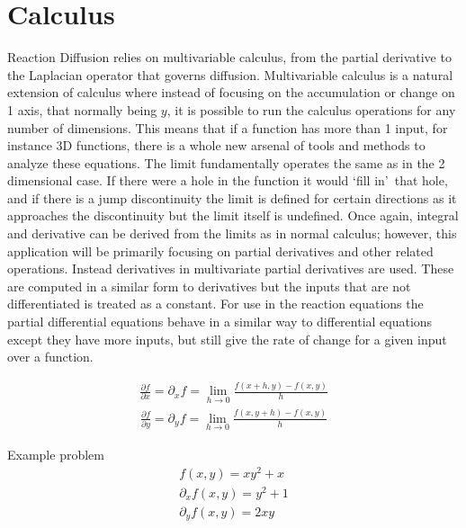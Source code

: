 \documentclass[12pt, letterpaper]{article}
\newcommand{\sorta}[1]{\lq #1\rq \,}
\begin{document}
\section{Calculus} \label{calculus}
Reaction Diffusion relies on multivariable calculus, from the partial derivative to the Laplacian 
operator that governs diffusion. Multivariable calculus is a natural extension of calculus where instead of 
focusing on the accumulation or change on 1 axis, that normally being $y$, it is possible to run the calculus
operations for any
number of dimensions. This means that if a function has more than 1 input, for instance 3D functions,
there is a whole new arsenal of tools and methods to analyze these equations. The limit
fundamentally operates the same as in the 2 dimensional case. If there were a hole in the function it
would \sorta{fill in} that hole, and if there is a jump discontinuity the limit is
defined for certain directions as it approaches the discontinuity but the limit itself is undefined. Once
again, integral and derivative can be derived from the limits as in normal calculus; however, this
application will be primarily focusing on partial derivatives and other related operations. Instead
derivatives in multivariate partial derivatives are used. These are computed in a similar form to
derivatives but the inputs that are not
differentiated is treated as a constant. For use in the reaction equations the partial differential equations
behave in a similar way to differential equations except they have more inputs, but still give the rate 
of change for a given input over a function.

\begin{singlespace}
  \begin{gather}
    \frac{\partial f}{\partial x} = \partial_x{f} = \lim_{h \to 0} \frac{f(x+h, y) − f(x,y)}{h}
    \label{eq:partX}
  \end{gather}
  \begin{gather}
    \frac{\partial f}{\partial y} = \partial_y{f} = \lim_{h \to 0} \frac{f(x, y + h) − f(x,y)}{h}
    \label{eq:partY}
  \end{gather}

  \begin{center}
   Example problem
   \begin{gather*}
    f(x, y) = xy^2 + x \\
    \partial_x f(x,y) = y^2 + 1 \\
    \partial_y f(x,y) = 2xy
   \end{gather*}
  \end{center}
\end{singlespace}
\end{document}
